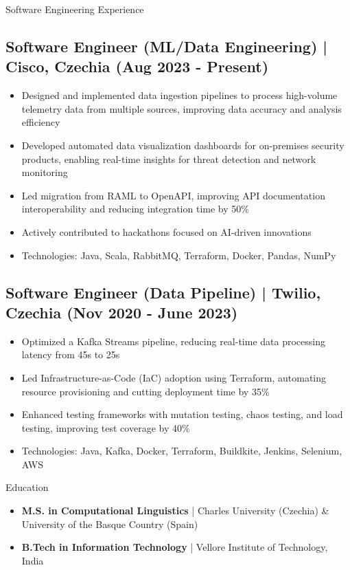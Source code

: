 \documentclass{resume} %
\begin{document}
\begin{rSection}{Software Engineering Experience}

    \subsection*{Software Engineer (ML/Data Engineering) | Cisco, Czechia (Aug 2023 - Present)}
        \begin{itemize}
            \item Designed and implemented data ingestion pipelines to process high-volume telemetry data from multiple sources, improving data accuracy and analysis efficiency
            \item Developed automated data visualization dashboards for on-premises security products, enabling real-time insights for threat detection and network monitoring
            \item Led migration from RAML to OpenAPI, improving API documentation interoperability and reducing integration time by 50\%
            \item Actively contributed to hackathons focused on AI-driven innovations
            \item Technologies: Java, Scala, RabbitMQ, Terraform, Docker, Pandas, NumPy \end{itemize}

    \subsection*{Software Engineer (Data Pipeline) | Twilio, Czechia (Nov 2020 - June 2023)}
        \begin{itemize}
            \item Optimized a Kafka Streams pipeline, reducing real-time data processing latency from 45s to 25s
            \item Led Infrastructure-as-Code (IaC) adoption using Terraform, automating resource provisioning and cutting deployment time by 35\%%
            \item Enhanced testing frameworks with mutation testing, chaos testing, and load testing, improving test coverage by 40\%
            \item Technologies: Java, Kafka, Docker, Terraform, Buildkite, Jenkins, Selenium, AWS \end{itemize}
\end{rSection}

\begin{rSection}{Education}
    \begin{itemize}
        \item \textbf{M.S. in Computational Linguistics} | Charles University (Czechia) \& University of the Basque Country (Spain)
        \item \textbf{B.Tech in Information Technology} | Vellore Institute of Technology, India
    \end{itemize}
\end{rSection}
\end{document}
